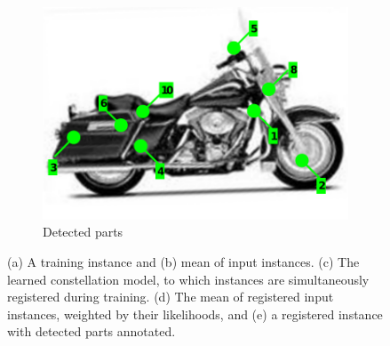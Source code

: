 \begin{figure}[ht]
\begin{subfigure}[b]{0.28\linewidth}
	\includegraphics[width=\linewidth]{fig/3dreg/onebike_after3.pdf}
	\caption{Detected parts}
\end{subfigure}
\caption{(a) A training instance and (b) mean of input instances. (c) The learned constellation model, to which instances are simultaneously registered during training. (d) The mean of registered input instances, weighted by their likelihoods, and (e) a registered instance with detected parts annotated.}
\label{fig:concept}
\end{figure}




